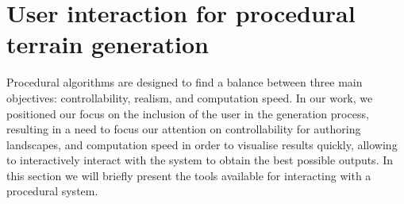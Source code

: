




\section{User interaction for procedural terrain generation}
Procedural algorithms are designed to find a balance between three main objectives: controllability, realism, and computation speed. In our work, we positioned our focus on the inclusion of the user in the generation process, resulting in a need to focus our attention on controllability for authoring landscapes, and computation speed in order to visualise results quickly, allowing to interactively interact with the system to obtain the best possible outputs. In this section we will briefly present the tools available for interacting with a procedural system.

